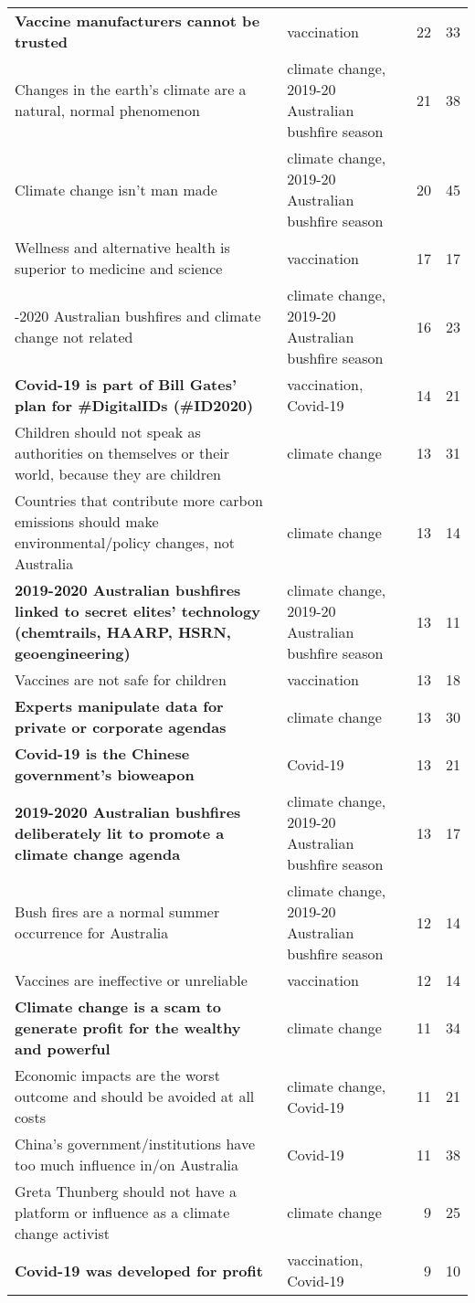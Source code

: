 \begin{table*}
\begin{tabular}{p{8cm}p{4cm}rr}
\textbf{Vaccine manufacturers cannot be trusted} & vaccination & 22 & 33\\
Changes in the earth's climate are a natural, normal phenomenon & climate change, 2019-20 Australian bushfire season & 21 & 38\\
Climate change isn't man made & climate change, 2019-20 Australian bushfire season & 20 & 45\\
Wellness and alternative health is superior to medicine and science & vaccination & 17 & 17\\
\addlinespace
2019-2020 Australian bushfires and climate change not related & climate change, 2019-20 Australian bushfire season & 16 & 23\\
\textbf{Covid-19 is part of Bill Gates' plan for \#DigitalIDs (\#ID2020)} & vaccination, Covid-19 & 14 & 21\\
Children should not speak as authorities on themselves or their world, because they are children & climate change & 13 & 31\\
Countries that contribute more carbon emissions should make environmental/policy changes, not Australia & climate change & 13 & 14\\
\textbf{2019-2020 Australian bushfires linked to secret elites' technology (chemtrails, HAARP, HSRN, geoengineering)} & climate change, 2019-20 Australian bushfire season & 13 & 11\\
\addlinespace
Vaccines are not safe for children & vaccination & 13 & 18\\
\textbf{Experts manipulate data for private or corporate agendas} & climate change & 13 & 30\\
\textbf{Covid-19 is the Chinese government's bioweapon} & Covid-19 & 13 & 21\\
\textbf{2019-2020 Australian bushfires deliberately lit to promote a climate change agenda} & climate change, 2019-20 Australian bushfire season & 13 & 17\\
Bush fires are a normal summer occurrence for Australia & climate change, 2019-20 Australian bushfire season & 12 & 14\\
\addlinespace
Vaccines are ineffective or unreliable & vaccination & 12 & 14\\
\textbf{Climate change is a scam to generate profit for the wealthy and powerful} & climate change & 11 & 34\\
Economic impacts are the worst outcome and should be avoided at all costs & climate change, Covid-19 & 11 & 21\\
China's government/institutions have too much influence in/on Australia & Covid-19 & 11 & 38\\
Greta Thunberg should not have a platform or influence as a climate change activist & climate change & 9 & 25\\
\addlinespace
\textbf{Covid-19 was developed for profit} & vaccination, Covid-19 & 9 & 10\\
\bottomrule
\end{tabular}
\end{table*}

